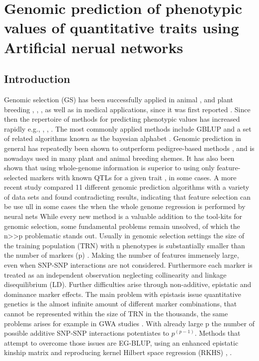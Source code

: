 
\chapter{Genomic prediction of phenotypic values of quantitative traits using Artificial nerual networks}

\label{Chapter3} %




\section{Introduction}
Genomic selection (GS) has been successfully applied in animal \cite{gianola2015one}, \cite{hayes2010genome}
and plant breeding \cite{crossa2010}, \cite{desta2014genomic}, \cite{heffner2010plant}, \cite{crossa2017genomic}
as well as in medical applications, since it was first reported  \cite{hayes2001}. Since then the repertoire of
methods for predicting phenotypic values has increased rapidly e.g.\cite{dlc2009}, \cite{habier2011}, \cite{gianola2013} , \cite{crossa2017}. The most commonly applied methods include GBLUP and a set of related algorithms known as the bayesian alphabet \cite{gianola2009}. 
Genomic prediction in general has repeatedly been shown to outperform pedigree-based methods \cite{crossa2010},
\cite{albrecht2011} and is nowadays used in many plant and animal breeding shemes. 
It has also been shown that using whole-genome information is superior to using only feature-selected markers
with known QTLs for a given trait \cite{bernardo2007}, \cite{heffner2011} in some cases. A more recent study
\cite{azodi2019} compared 11 different genomic prediction algorithms with a variety of data sets and found
contradicting results, indicating that feature selection can be use ull in some cases the when the whole
genome regression is performed by neural nets 
While every new method is a valuable addition to the tool-kits for genomic selection, some fundamental
problems remain unsolved, of which the n>>p problematic stands out. Usually in genomic selection settings
the size of the training population (TRN) with n phenotypes is substantially smaller than the number of
markers (p) \cite{fan2014challenges}. Making the number of features immensely large,  even when SNP-SNP
interactions are not considered.  Furthermore each marker is treated as an independent observation
neglecting collinearity and linkage disequilibrium (LD). 
Further difficulties arise through non-additive, epistatic and dominance marker effects. The main problem
with epistasis issue quantitative genetics is the almost infinite amount of different marker combinations,
that cannot be represented within the size of TRN in the thousands, the same problems arises for example
in GWA studies \cite{korte2013}. With already large p the number of possible additive SNP-SNP interactions
potentiates to $p^{(p-1)}$. Methods that attempt to overcome those issues are EG-BLUP, using an enhanced
epistatic kinship matrix and reproducing kernel Hilbert space regression (RKHS) \cite{jiang2015}, \cite{martini2017genomic}.

